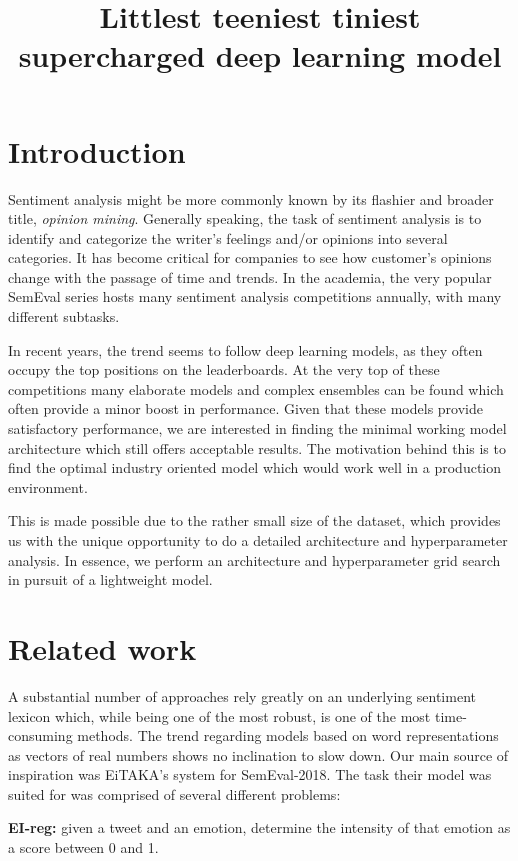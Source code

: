 \documentclass[10pt, a4paper]{article}
\title{Littlest teeniest tiniest supercharged deep learning model}
\begin{document}
\maketitleabstract

\section{Introduction}

Sentiment analysis might be more commonly known by its flashier and broader title, \textit{opinion mining}. 
Generally speaking, the task of sentiment analysis is to identify and categorize the writer's feelings and/or opinions into several categories. 
It has become critical for companies to see how customer's opinions change with the passage of time and trends. 
In the academia, the very popular SemEval series hosts many sentiment analysis competitions annually, with many different subtasks.

In recent years, the trend seems to follow deep learning models,
as they often occupy the top positions on the leaderboards.
At the very top of these competitions many elaborate models 
and complex ensembles can be found
which often provide a minor boost in performance.
Given that these models provide satisfactory performance,
we are interested in finding the minimal working model architecture
which still offers acceptable results.
The motivation behind this is to find the optimal industry oriented
model which would work well in a production environment.

This is made possible due to the rather small size of the dataset,
which provides us with the unique opportunity to do a detailed
architecture and hyperparameter analysis.
In essence, we perform an architecture and hyperparameter grid
search in pursuit of a lightweight model.

\section{Related work}
A substantial number of approaches rely greatly on an underlying sentiment lexicon \citep{lexicon_paper} which, while being one of the most robust, is one of the most time-consuming methods. The trend regarding models based on word representations as vectors of real numbers \citep{w2v} shows no inclination to slow down. Our main source of inspiration was EiTAKA's system \citep{mohammed-semeval} for SemEval-2018. The task their model was suited for was comprised of several different problems:

\textbf{EI-reg:} given a tweet and an emotion, determine the intensity of that emotion as a score between 0 and 1.
\end{document}
